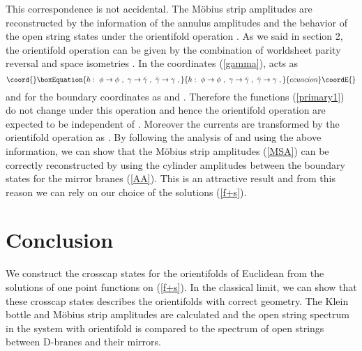 \documentclass[a4paper,12pt]{article}
\providecommand{\bz}{\mathbb Z}
\providecommand{\brp}{{\mathbb R \mathbb P}^2}
\begin{document}
This correspondence is not accidental.
The M\"{o}bius strip amplitudes are reconstructed by the information of 
the annulus amplitudes and the behavior of the open string states under the
orientifold operation \cite{oplane3}.
As we said in section 2, the orientifold operation can be given by the
combination of worldsheet parity reversal \myHighlight{$\Omega$}\coordHE{} and space \myHighlight{$\bz_2$}\coordHE{}
isometries \coordHE{}. 
In the coordinates (\ref{gamma}), \coordHE{} acts as  
\begin{equation}\coord{}\boxEquation{
 h : ~ \phi \to \phi ~, ~ \gamma \to \bar{\gamma} ~,~ \bar{\gamma} \to \gamma
 ~,
}{
 h : ~ \phi \to \phi ~, ~ \gamma \to \bar{\gamma} ~,~ \bar{\gamma} \to \gamma
 ~,
}{ecuacion}\coordE{}\end{equation}
and for the boundary coordinates as \coordHE{} and \coordHE{}.
Therefore the functions (\ref{primary1}) do not change under this
operation and hence the orientifold operation are expected to be
independent of \coordHE{}.  
Moreover the currents are transformed by the orientifold operation as
\coordHE{}. 
By following the analysis of \cite{oplane2} and using the above information, 
we can show that the M\"{o}bius strip amplitudes (\ref{MSA}) can be
correctly reconstructed by using the cylinder amplitudes between the
boundary states for the mirror branes (\ref{AA}). 
This is an attractive result and from this reason we can rely on our
choice of the solutions (\ref{f+s}).  



\section{Conclusion}
\indent

We construct the crosscap states for the orientifolds of Euclidean
\coordHE{} from the solutions of one point functions on \myHighlight{$\brp$}\coordHE{} (\ref{f+s}).
In the classical limit, we can show that these crosscap states describes 
the orientifolds with correct geometry.  
The Klein bottle and M\"{o}bius strip amplitudes are calculated and the open
string spectrum in the system with orientifold is compared to the
spectrum of open strings between D-branes and their mirrors.
\end{document}
